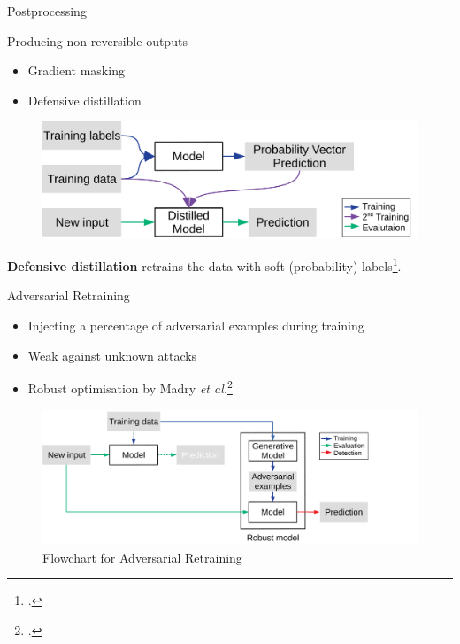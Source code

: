 \documentclass[9pt]{beamer}
\begin{document}
\begin{frame}{Postprocessing}

Producing non-reversible outputs
\begin{itemize}
    \item Gradient masking
    \item Defensive distillation
\end{itemize}

\begin{examples}
    \begin{figure}
        \centering
        \small
        \includegraphics[width=0.8\linewidth]{images/distillation.pdf}
    \end{figure}
    \textbf{Defensive distillation} retrains the data with soft (probability) labels\footcite{papernot2016distillation}.
\end{examples}

\end{frame}

\begin{frame}{Adversarial Retraining}
\label{adv_training}

\begin{itemize}
    \item Injecting a percentage of adversarial examples during training
    \item Weak against unknown attacks
    \item Robust optimisation by Madry {\em et al.}\footcite{madry2017towards}
\end{itemize}

\begin{figure}
    \centering
    \includegraphics[width=0.85\linewidth]{images/adversarial-training.pdf}
    \caption{Flowchart for Adversarial Retraining}
\end{figure}

\hyperlink{adv_examples}{}
\end{frame}
\end{document}

